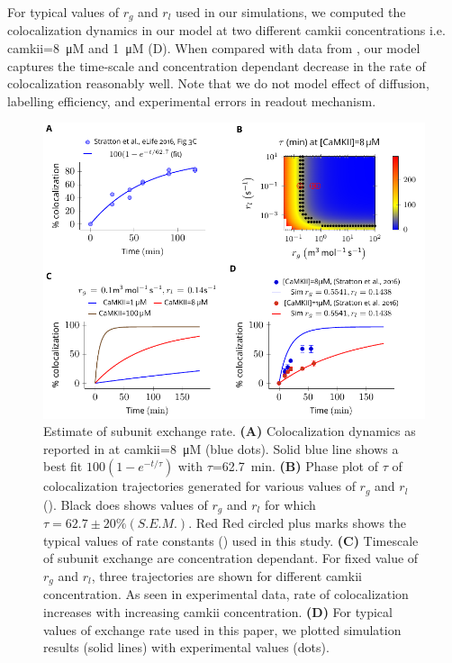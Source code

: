 \documentclass[9pt,lineno]{elife}
\begin{document}
{For typical values of $r_g$ and $r_l$ used in our simulations, we computed the
colocalization dynamics in our model at two different \gls{camkii}
concentrations i.e. \gls{camkii}=\SI{8}{\micro M} and \SI{1}{\micro M}
(D). When compared with data from
\cite{stratton_activation-triggered_2014}, our model captures the time-scale and
concentration dependant decrease in the rate of colocalization reasonably well.
Note that we do not model effect of diffusion, labelling efficiency, and
experimental errors in readout mechanism.  

\begin{figure}[ht!]
    \includegraphics[width=\linewidth]{./PaperFigures/elifeFigure8/figure_exchange_rate.pdf}
    \caption{Estimate of subunit exchange rate. \textbf{(A)} Colocalization
        dynamics as reported in \cite{stratton_activation-triggered_2014} at
        \gls{camkii}=\SI{8}{\micro M} (blue dots). Solid blue line shows a best
        fit $100(1-e^{-t/\tau})$ with $\tau$=\SI{62.7}{min}. \textbf{(B)} Phase
        plot of $\tau$ of colocalization trajectories generated for various
        values of $r_g$ and $r_l$ (). Black does shows values
        of $r_g$ and $r_l$ for which $\tau=62.7\pm 20\% (S.E.M.)$. Red Red
        circled plus marks shows the typical values of rate constants
        () used in this study. \textbf{(C)} Timescale of subunit
        exchange are concentration dependant. For fixed value of $r_g$ and
        $r_l$, three trajectories are shown for different \gls{camkii}
        concentration. As seen in experimental data, rate of colocalization
        increases with increasing \gls{camkii} concentration. \textbf{(D)} For
        typical values of exchange rate used in this paper, we plotted
        simulation results (solid lines) with experimental values (dots).
    }\label{fig:estimate_of_exchange_rate}
\end{figure}



}
\end{document}
